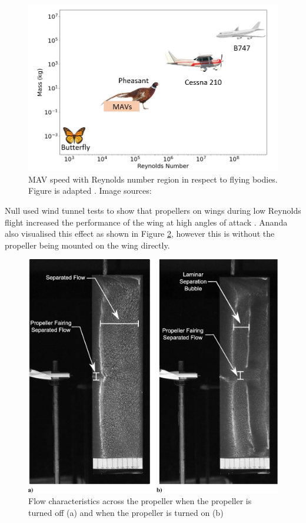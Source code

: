 \begin{figure}[H]
  \centering
  \includegraphics[width=\linewidth]{03_LiteratureReview/Figs/Reynolds.JPG}
  \caption{MAV speed with Reynolds number region in respect to flying bodies. Figure is adapted \cite{reynoldsFigure}. Image sources: \cite{butterfly, pheasant, cess, b474} }
  \label{fig:MAVsizes}
\end{figure}

 Null used wind tunnel tests to show that propellers on wings during low Reynolds flight increased the performance of the wing at high angles of attack \cite{Null2005}. Ananda also visualised this effect as shown in Figure \ref{fig:bladeslow}, however this is without the propeller being mounted on the wing directly.  

\begin{figure}[H]
  \centering
  \includegraphics[width=0.8\linewidth]{03_LiteratureReview/Figs/blades.jpeg}
  \caption{Flow characteristics across the propeller when the propeller is turned off (a) and when the propeller is turned on (b) \cite{Ananda2018}}
  \label{fig:bladeslow}
\end{figure}



